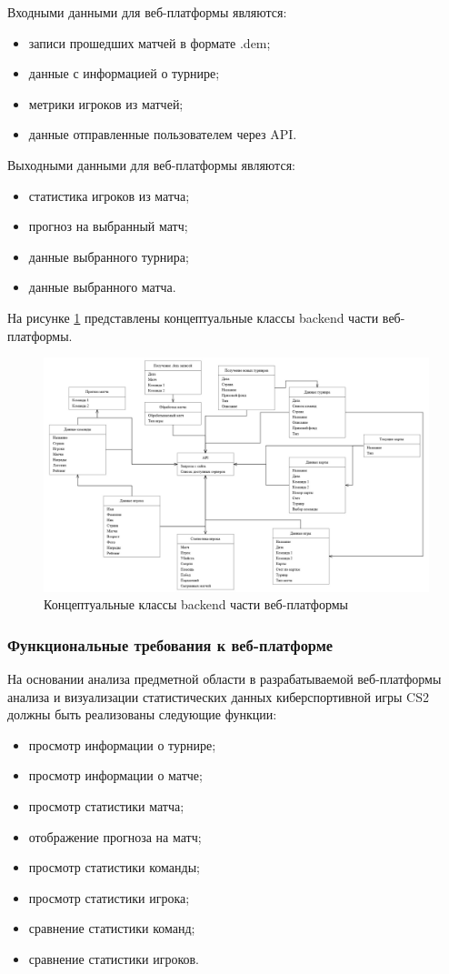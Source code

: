 Входными данными для веб-платформы являются:
\begin{itemize}
	\item записи прошедших матчей в формате .dem;
	\item данные с информацией о турнире;
	\item метрики игроков из матчей;
	\item данные отправленные пользователем через API.
\end{itemize}

Выходными данными для веб-платформы являются:
\begin{itemize}
	\item статистика игроков из матча;
	\item прогноз на выбранный матч;
	\item данные выбранного турнира;
	\item данные выбранного матча.
\end{itemize}

На рисунке \ref{fig:-conceptual_classes} представлены концептуальные классы backend части веб-платформы.
\begin{figure}
	\centering
	\includegraphics[width=0.7\linewidth]{"images/Концептуальные классы"}
	\caption[Концептуальные классы backend части веб-платформы]{Концептуальные классы backend части веб-платформы}
	\label{fig:-conceptual_classes}
\end{figure}

\subsubsection{Функциональные требования к веб-платформе}

На основании анализа предметной области в разрабатываемой веб-платформы анализа и визуализации статистических данных киберспортивной игры CS2 должны быть реализованы следующие функции:
\begin{itemize}
	\item просмотр информации о турнире;
	\item просмотр информации о матче;
	\item просмотр статистики матча;
	\item отображение прогноза на матч;
	\item просмотр статистики команды;
	\item просмотр статистики игрока;
	\item сравнение статистики команд;
	\item сравнение статистики игроков.
\end{itemize}

